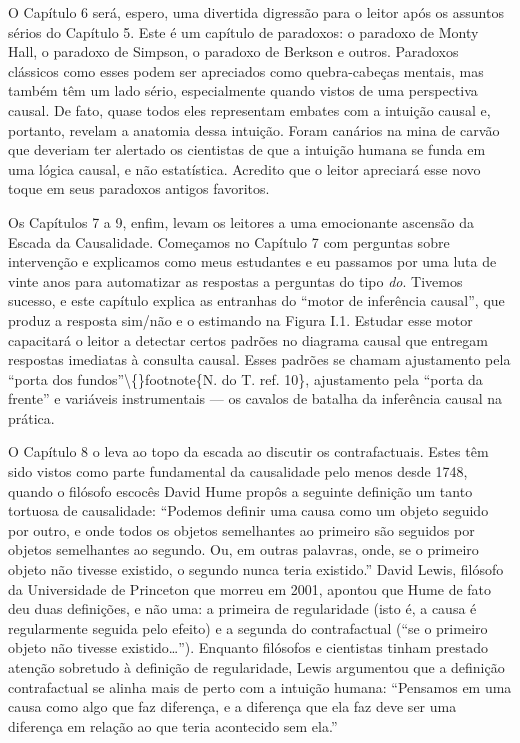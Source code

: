 \documentclass[11pt,a5paper,twoside]{book}
\begin{document}
O Capítulo 6 será, espero, uma divertida digressão para o leitor após os assuntos sérios do Capítulo 5. Este é um capítulo de paradoxos: o paradoxo de Monty Hall, o paradoxo de Simpson, o paradoxo de Berkson e outros. Paradoxos clássicos como esses podem ser apreciados como quebra-cabeças mentais, mas também têm um lado sério, especialmente quando vistos de uma perspectiva causal. De fato, quase todos eles representam embates com a intuição causal e, portanto, revelam a anatomia dessa intuição. Foram canários na mina de carvão que deveriam ter alertado os cientistas de que a intuição humana se funda em uma lógica causal, e não estatística. Acredito que o leitor apreciará esse novo toque em seus paradoxos antigos favoritos.

Os Capítulos 7 a 9, enfim, levam os leitores a uma emocionante ascensão da Escada da Causalidade. Começamos no Capítulo 7 com perguntas sobre intervenção e explicamos como meus estudantes e eu passamos por uma luta de vinte anos para automatizar as respostas a perguntas do tipo \textit{do}. Tivemos sucesso, e este capítulo explica as entranhas do “motor de inferência causal”, que produz a resposta sim/não e o estimando na Figura I.1. Estudar esse motor capacitará o leitor a detectar certos padrões no diagrama causal que entregam respostas imediatas à consulta causal. Esses padrões se chamam ajustamento pela “porta dos fundos”\textbackslash\{\}footnote\{N. do T. ref. 10\}, ajustamento pela “porta da frente” e variáveis instrumentais — os cavalos de batalha da inferência causal na prática.

O Capítulo 8 o leva ao topo da escada ao discutir os contrafactuais. Estes têm sido vistos como parte fundamental da causalidade pelo menos desde 1748, quando o filósofo escocês David Hume propôs a seguinte definição um tanto tortuosa de causalidade: “Podemos definir uma causa como um objeto seguido por outro, e onde todos os objetos semelhantes ao primeiro são seguidos por objetos semelhantes ao segundo. Ou, em outras palavras, onde, se o primeiro objeto não tivesse existido, o segundo nunca teria existido.” David Lewis, filósofo da Universidade de Princeton que morreu em 2001, apontou que Hume de fato deu duas definições, e não uma: a primeira de regularidade (isto é, a causa é regularmente seguida pelo efeito) e a segunda do contrafactual (“se o primeiro objeto não tivesse existido…”). Enquanto filósofos e cientistas tinham prestado atenção sobretudo à definição de regularidade, Lewis argumentou que a definição contrafactual se alinha mais de perto com a intuição humana: “Pensamos em uma causa como algo que faz diferença, e a diferença que ela faz deve ser uma diferença em relação ao que teria acontecido sem ela.”
\end{document}

